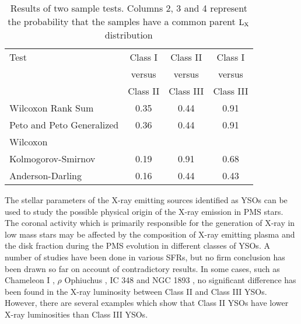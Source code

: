\documentclass[a4paper,fleqn,usenatbib,useAMS]{mnras}
\begin{document}
\begin{table}
\caption{Results of two sample tests. Columns 2, 3 and 4 represent the probability that the
samples have a common parent $\rm{L_X}$ distribution }             %
\label{tab:two_sample}      %
\begin{tabular}{lccc}       %
\hline
Test                                & Class I    &  Class II    &  Class I    \\
                                    &   versus         &   versus          &     versus        \\
                                     & Class II   &   Class III   &  Class III   \\
\hline
Wilcoxon Rank Sum                    &    0.35 &    0.44 &    0.91  \\
Peto and Peto Generalized            &    0.36 &    0.44 &    0.91  \\
Wilcoxon                            &         &         &           \\
Kolmogorov-Smirnov                   &    0.19 &    0.91 &    0.68  \\
Anderson-Darling                     &    0.16 &    0.44 &    0.43  \\
\hline
\end{tabular}
\end{table}


The stellar parameters of the X-ray emitting sources identified as YSOs 
can be used to study the possible physical origin of the X-ray emission in PMS stars. 
The coronal activity which is primarily responsible for the generation of X-ray in low mass stars may be affected by the
composition of X-ray emitting plasma and the disk fraction during the PMS evolution in different classes of YSOs.
A number of studies have been done in various SFRs, but no firm conclusion has been drawn so far on account of contradictory results.
In some cases, such as Chameleon I \citep{fei+93}, $\rho$ Ophiuchus \citep{cas+95},  IC 348
\citep{pre+02} and NGC 1893 \citep{2014NewA...29...18P}, no significant difference has been found in the  X-ray  luminosity between Class  II  and  Class III  YSOs.
However, there are several examples \citep{ste+01, fla+03, sta+04, pre+05, fla+06, tel+07, gua+12}
which show that Class  II YSOs have lower X-ray  luminosities  than  Class  III  YSOs.
\end{document}
